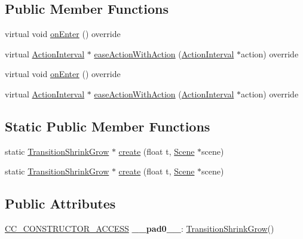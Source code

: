 \subsection*{Public Member Functions}
\begin{DoxyCompactItemize}
\item 
virtual void \hyperlink{classTransitionShrinkGrow_a7ae52d07e1889121b706fbc6b1e7b6ff}{on\+Enter} () override
\item 
virtual \hyperlink{classActionInterval}{Action\+Interval} $\ast$ \hyperlink{classTransitionShrinkGrow_a82ee7adb79f7d88a67a281736f2c19ba}{ease\+Action\+With\+Action} (\hyperlink{classActionInterval}{Action\+Interval} $\ast$action) override
\item 
virtual void \hyperlink{classTransitionShrinkGrow_af22969e16b81f0880e5ef6c768c88961}{on\+Enter} () override
\item 
virtual \hyperlink{classActionInterval}{Action\+Interval} $\ast$ \hyperlink{classTransitionShrinkGrow_af2d5d53552fcfe2f8d61f89f1663444d}{ease\+Action\+With\+Action} (\hyperlink{classActionInterval}{Action\+Interval} $\ast$action) override
\end{DoxyCompactItemize}
\subsection*{Static Public Member Functions}
\begin{DoxyCompactItemize}
\item 
static \hyperlink{classTransitionShrinkGrow}{Transition\+Shrink\+Grow} $\ast$ \hyperlink{classTransitionShrinkGrow_a524886b8f3e704f07a07e2fa024d10bb}{create} (float t, \hyperlink{classScene}{Scene} $\ast$scene)
\item 
static \hyperlink{classTransitionShrinkGrow}{Transition\+Shrink\+Grow} $\ast$ \hyperlink{classTransitionShrinkGrow_a3abaa5b662b31c26e5480f2204c6d8d9}{create} (float t, \hyperlink{classScene}{Scene} $\ast$scene)
\end{DoxyCompactItemize}
\subsection*{Public Attributes}
\begin{DoxyCompactItemize}
\item 
\mbox{\label{classTransitionShrinkGrow_a48468484ea74df444ae407ef2443ca4b}} 
\hyperlink{_2cocos2d_2cocos_2base_2ccConfig_8h_a25ef1314f97c35a2ed3d029b0ead6da0}{C\+C\+\_\+\+C\+O\+N\+S\+T\+R\+U\+C\+T\+O\+R\+\_\+\+A\+C\+C\+E\+SS} {\bfseries \+\_\+\+\_\+pad0\+\_\+\+\_\+}\+: \hyperlink{classTransitionShrinkGrow}{Transition\+Shrink\+Grow}()
\end{DoxyCompactItemize}
